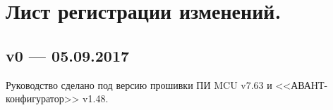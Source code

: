 \section*{Лист регистрации изменений.}

\subsection*{v0 --- 05.09.2017}

Руководство сделано под версию прошивки ПИ MCU v7.63 и <<АВАНТ-конфигуратор>> v1.48. 
